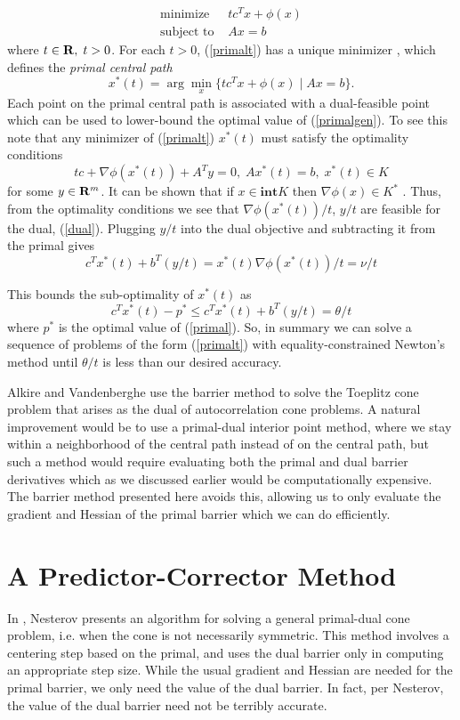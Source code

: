 \documentclass{article}
\begin{document}
\begin{equation}\label{primalt}
  \begin{array}{ll}
    \mbox{minimize}    & tc^Tx + \phi(x)\\
    \mbox{subject to } & Ax = b
  \end{array}
\end{equation}
where $t \in \mathbf{R},\;t >0$. For each $t >0$, (\ref{primalt}) has a unique minimizer \cite{BoV:04},
which defines the \emph{primal central path}
\[
  x^*(t) = \arg\min_x\{tc^Tx + \phi(x) \mid Ax=b\}.
\]
Each point on the primal central path is associated with a dual-feasible point which
can be used to lower-bound the optimal value of (\ref{primalgen}). To see this note that
any minimizer of (\ref{primalt}) $x^*(t)$ must satisfy the
optimality conditions
\[
  tc + \nabla\phi(x^*(t)) + A^Ty = 0 ,\; Ax^*(t) = b ,\; x^*(t) \in K
\]
for some $y\in\mathbf{R}^m$. It can be shown that if  $x \in \mathbf{int} K$ then
$\nabla\phi(x) \in K^*$ \cite{alkire2002convex}. Thus, from the optimality conditions we 
see that $\nabla\phi(x^*(t))/t$, $y/t$ are feasible for the dual, (\ref{dual}).
Plugging $y/t$ into the dual objective and subtracting it from the primal gives
\[
  c^Tx^*(t) + b^T(y/t) =  x^*(t)\nabla\phi(x^*(t))/t = \nu/t
\]

This bounds the sub-optimality of $x^*(t)$ as
\[
  c^Tx^*(t) - p^* \leq c^Tx^*(t) + b^T(y/t) = \theta/t 
\]
where $p^*$ is the optimal value of (\ref{primal}). So, in summary we can solve a sequence of 
problems of the form (\ref{primalt}) with equality-constrained Newton's
method until $\theta/t$ is less than our desired accuracy. 

Alkire and Vandenberghe \cite{alkire2002convex} use the barrier method to solve
the Toeplitz cone problem that arises as the dual of autocorrelation cone
problems. A natural improvement would be to use a primal-dual interior point
method, where we stay within a neighborhood of the central path instead of on
the central path, but such a method would require evaluating both the primal
and dual barrier derivatives which as we discussed earlier would be
computationally expensive. The barrier method presented here avoids this,
allowing us to only evaluate the gradient and Hessian of the primal barrier
which we can do efficiently.

\section{A Predictor-Corrector Method}
In \cite{nesterov2006towards}, Nesterov presents an algorithm for solving a general
primal-dual cone problem, i.e. when the cone is not necessarily symmetric. This
method involves a centering step based on the primal, and uses the dual barrier
only in computing an appropriate step size. While the usual gradient and
Hessian are needed for the primal barrier, we only need the value of the dual
barrier. In fact, per Nesterov, the value of the dual barrier need not be terribly accurate.
\end{document}

